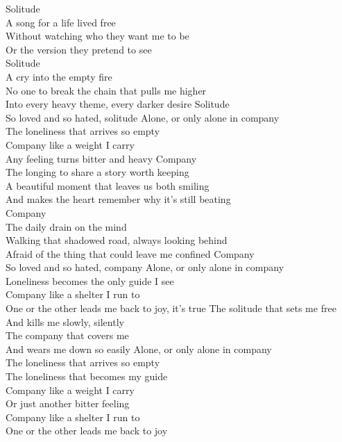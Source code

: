 \begin{lyrics}
Solitude\\
A song for a life lived free\\
Without watching who they want me to be\\
Or the version they pretend to see\\
Solitude\\
A cry into the empty fire\\
No one to break the chain that pulls me higher\\
Into every heavy theme, every darker desire
Solitude\\
So loved and so hated, solitude
Alone, or only alone in company\\
The loneliness that arrives so empty\\
Company like a weight I carry\\
Any feeling turns bitter and heavy
Company\\
The longing to share a story worth keeping\\
A beautiful moment that leaves us both smiling\\
And makes the heart remember why it’s still beating\\
Company\\
The daily drain on the mind\\
Walking that shadowed road, always looking behind\\
Afraid of the thing that could leave me confined
Company\\
So loved and so hated, company
Alone, or only alone in company\\
Loneliness becomes the only guide I see\\
Company like a shelter I run to\\
One or the other leads me back to joy, it’s true
The solitude that sets me free\\
And kills me slowly, silently\\
The company that covers me\\
And wears me down so easily
Alone, or only alone in company\\
The loneliness that arrives so empty\\
The loneliness that becomes my guide\\
Company like a weight I carry\\
Or just another bitter feeling\\
Company like a shelter I run to\\
One or the other leads me back to joy
\end{lyrics}

